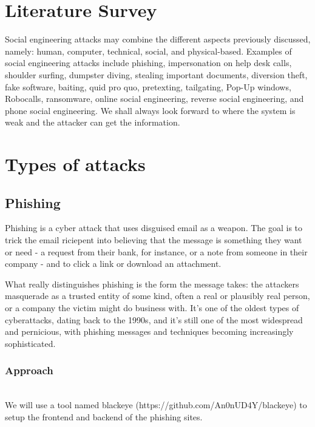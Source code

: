 \documentclass[a4paper,12pt]{article}
\begin{document}
\section{Literature Survey}

Social engineering attacks may combine
the different aspects previously discussed,
namely: human, computer, technical, social, and physical-based. Examples of social engineering attacks include phishing,
impersonation on help desk calls, shoulder surfing, dumpster diving, stealing important documents, diversion theft, fake
software, baiting, quid pro quo, pretexting, tailgating, Pop-Up windows, Robocalls, ransomware, online social engineering, reverse social engineering, and phone
social engineering.
We shall always look forward to where the
system is weak and the attacker can get the
information.

\section{Types of attacks}

\subsection{Phishing}
Phishing is a cyber attack that uses disguised email as a weapon. The goal is to trick the email riciepent into believing that the message is something they want or need - a request from their bank, for instance, or a note from someone in their company - and to click a link or download an attachment. 

What really distinguishes phishing is the form the message takes: the attackers masquerade as a trusted entity of some kind, often a real or plausibly real person, or a company the victim might do business with. It's one of the oldest types of cyberattacks, dating back to the 1990s, and it's still one of the most widespread and pernicious, with phishing messages and techniques becoming increasingly sophisticated.

\subsubsection{Approach}
\\
We will use a tool named blackeye (https://github.com/An0nUD4Y/blackeye) to setup the frontend and backend of the phishing sites. \\
\\
\\
\\
\\
\\
\\
\\
\end{document}
